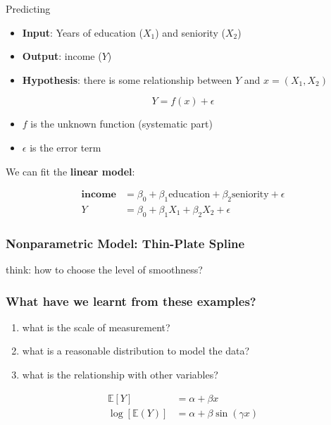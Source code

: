 \documentclass[11pt]{article}
\begin{document}
Predicting
\begin{itemize}
    \item \textbf{Input}: Years of education ($X_1$) and seniority ($X_2$)
    \item \textbf{Output}: income ($Y$)
    \item \textbf{Hypothesis}: there is some relationship between $Y$ and $x = (X_1, X_2)$
\end{itemize}

\begin{equation}
    Y = f(x) + \epsilon
\end{equation}

\begin{itemize}
    \item $f$ is the unknown function (systematic part)
    \item $\epsilon$ is the error term
\end{itemize}

We can fit the \textbf{linear model}:

\begin{align}
    \textbf{income} &= \beta_0 + \beta_1 \text{education} + \beta_2 \text{seniority} + \epsilon \\
    Y &= \beta_0 + \beta_1 X_1 + \beta_2 X_2 + \epsilon
\end{align}

\subsubsection{Nonparametric Model: Thin-Plate Spline}

think: how to choose the level of smoothness?

\subsubsection{What have we learnt from these examples?}

\begin{enumerate}
    \item what is the scale of measurement?
    \item what is a reasonable distribution to model the data?
    \item what is the relationship with other variables?
\end{enumerate}

\begin{align}
    \mathbb{E}[Y] &= \alpha + \beta x \\
    \log[\mathbb{E}(Y)] &= \alpha + \beta \sin(\gamma x)
\end{align}
\end{document}
